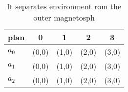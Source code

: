 \documentclass[a4paper]{article}
\begin{document}
\begin{table}
\begin{adjustbox}{width=0.5\columnwidth}
\begin{tabular}{|l|l|l|l|l|}
\hline
\textbf{plan} & \multicolumn{1}{c|}{\textbf{0}} & \multicolumn{1}{c|}{\textbf{1}} & \multicolumn{1}{c|}{\textbf{2}} & \multicolumn{1}{c|}{\textbf{3}} \\ \hline
\textbf{$a_0$}  & (0,0) & (1,0) & (2,0) & (3,0) \\ \hline
\textbf{$a_1$}  & (0,0) & (1,0) & (2,0) & (3,0) \\ \hline
\textbf{$a_2$}  & (0,0) & (1,0) & (2,0) & (3,0) \\ \hline
\end{tabular}
\end{adjustbox}
\caption{It separates environment rom the outer magnetosph
}
\end{table}
\end{document}

